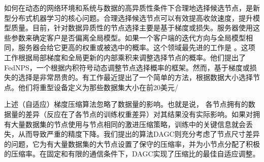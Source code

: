 如何在动态的网络环境和系统与数据的高异质性条件下合理地选择候选节点，是新型分布式机器学习的核心问题。合理选择候选节点可以有效提高收敛速度，提升模型质量。目前，针对数据异质性的节点选择主要是基于梯度或损失。服务器使用这些参数来确定客户是否偏离全局模型。如果一个客户端的迭代方向与全局模型相同，服务器会给它更高的权重或被选中的概率。这个领域最先进的工作是 \cite{wu2022node}。这项工作根据局部梯度和全局更新的内部乘积来调整选择节点的概率。他们提出了FedNPS，一个根据内积符号动态调整节点选择概率的框架。然而，基于梯度或损失的选择是非常昂贵的。有工作\cite{dupuy2022learnings}最近提出了一个简单的方法，根据数据大小选择节点。他们将重型设备定义为那些数据集大小在前20美元/%

\fi

上述（自适应）梯度压缩算法忽略了数据量的影响。也就是说， 各节点拥有的数据量的差异（反应在了各节点的训练权重差异）对其结果没有实际影响。如果对拥有大量数据集的节点使用与节点相同的激进压缩策略，训练中的关键信息就会丢失，从而导致严重的精度下降。我们提出的算法DAGC则充分考虑了节点尺寸差异的问题，它为有大量数据集的大节点设置了保守的压缩率，并为小节点分配了积极的压缩率。在固定和有限的通信条件下，DAGC实现了压缩比的最佳自适应调整。